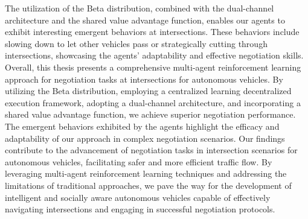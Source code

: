 \begin{e-abstract}
The utilization of the Beta distribution, combined with the dual-channel architecture and the shared value advantage function, enables our agents to exhibit interesting emergent behaviors at intersections.
These behaviors include slowing down to let other vehicles pass or strategically cutting through intersections, showcasing the agents' adaptability and effective negotiation skills.
Overall, this thesis presents a comprehensive multi-agent reinforcement learning approach for negotiation tasks at intersections for autonomous vehicles.
By utilizing the Beta distribution, employing a centralized learning decentralized execution framework, adopting a dual-channel architecture, and incorporating a shared value advantage function, we achieve superior negotiation performance.
The emergent behaviors exhibited by the agents highlight the efficacy and adaptability of our approach in complex negotiation scenarios.
Our findings contribute to the advancement of negotiation tasks in intersection scenarios for autonomous vehicles, facilitating safer and more efficient traffic flow.
By leveraging multi-agent reinforcement learning techniques and addressing the limitations of traditional approaches, we pave the way for the development of intelligent and socially aware autonomous vehicles capable of effectively navigating intersections and engaging in successful negotiation protocols.
\end{e-abstract}
